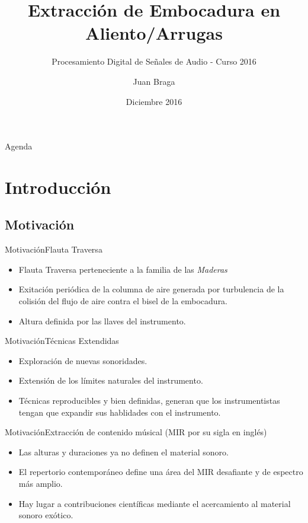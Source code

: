 \documentclass[aspectratio=169]{beamer}
\title{Extracción de Embocadura en Aliento/Arrugas}
\subtitle{Procesamiento Digital de Señales de Audio - Curso 2016}
\author{Juan Braga}%
\institute[IIE-FING-UDELAR] %
{
  Instituto de Ingeniería Eléctrica (IIE)\\
  Facultad de Ingeniería (FING)\\
  Universidad de la República (UDELAR)}
\date{Diciembre 2016}
\begin{document}
\begin{frame}
  \titlepage
\end{frame}

\begin{frame}{Agenda}
  \tableofcontents
\end{frame}

\section{Introducción}

\subsection{Motivación}

\begin{frame}{Motivación}{Flauta Traversa}
  \begin{itemize}
  \item {
    Flauta Traversa perteneciente a la familia de las \textit{Maderas}
  }
  \item {
    Exitación periódica de la columna de aire generada por turbulencia de la colisión del flujo de aire contra el bisel de la embocadura.
  }
    \item {
    Altura definida por las llaves del instrumento.
  }
  \end{itemize}
\end{frame}

\begin{frame}{Motivación}{Técnicas Extendidas}
  \begin{itemize}
  \item {
    Exploración de nuevas sonoridades.
  }
  \item {
    Extensión de los límites naturales del instrumento.
  }
    \item {
    Técnicas reproducibles y bien definidas, generan que los instrumentistas tengan que expandir sus hablidades con el instrumento.
  }
  \end{itemize}
\end{frame}

\begin{frame}{Motivación}{Extracción de contenido músical (MIR por su sigla en inglés)}
  \begin{itemize}
  \item {
    Las alturas y duraciones ya no definen el material sonoro.
  }
  \item {
    El repertorio contemporáneo define una área del MIR desafiante y de espectro más amplio.
  }
    \item {
   	Hay lugar a contribuciones científicas mediante el acercamiento al material sonoro exótico.
  }
  \end{itemize}
\end{frame}
\end{document}
